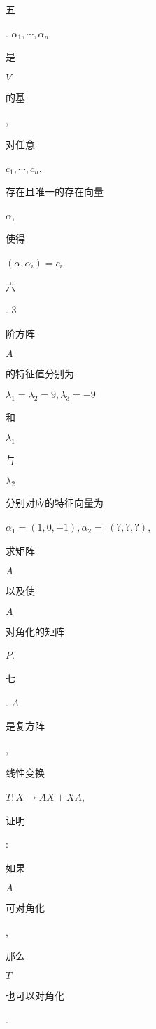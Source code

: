 \documentclass[10pt]{article}
\begin{document}
\begin{CJK}{UTF8}{mj}五\end{CJK}. $\alpha_{1}, \cdots, \alpha_{n}$ \begin{CJK}{UTF8}{mj}是\end{CJK} $V$ \begin{CJK}{UTF8}{mj}的基\end{CJK}, \begin{CJK}{UTF8}{mj}对任意\end{CJK} $c_{1}, \cdots, c_{n}$, \begin{CJK}{UTF8}{mj}存在且唯一的存在向量\end{CJK} $\alpha$, \begin{CJK}{UTF8}{mj}使得\end{CJK} $\left(\alpha, \alpha_{i}\right)=c_{i}$.

\begin{CJK}{UTF8}{mj}六\end{CJK}. 3 \begin{CJK}{UTF8}{mj}阶方阵\end{CJK} $A$ \begin{CJK}{UTF8}{mj}的特征值分别为\end{CJK} $\lambda_{1}=\lambda_{2}=9, \lambda_{3}=-9$ \begin{CJK}{UTF8}{mj}和\end{CJK} $\lambda_{1}$ \begin{CJK}{UTF8}{mj}与\end{CJK} $\lambda_{2}$ \begin{CJK}{UTF8}{mj}分别对应的特征向量为\end{CJK} $\alpha_{1}=(1,0,-1), \alpha_{2}=$ $(?, ?, ?)$, \begin{CJK}{UTF8}{mj}求矩阵\end{CJK} $A$ \begin{CJK}{UTF8}{mj}以及使\end{CJK} $A$ \begin{CJK}{UTF8}{mj}对角化的矩阵\end{CJK} $P$.

\begin{CJK}{UTF8}{mj}七\end{CJK}. $A$ \begin{CJK}{UTF8}{mj}是复方阵\end{CJK}, \begin{CJK}{UTF8}{mj}线性变换\end{CJK} $T: X \rightarrow A X+X A$, \begin{CJK}{UTF8}{mj}证明\end{CJK}: \begin{CJK}{UTF8}{mj}如果\end{CJK} $A$ \begin{CJK}{UTF8}{mj}可对角化\end{CJK}, \begin{CJK}{UTF8}{mj}那么\end{CJK} $T$ \begin{CJK}{UTF8}{mj}也可以对角化\end{CJK}.
\end{document}
